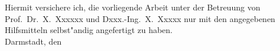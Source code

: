 \vspace*{130mm}
\begin{minipage}{129.5mm}

  Hiermit versichere ich, die vorliegende Arbeit unter der
  Betreuung von Prof.~Dr.~X.~Xxxxxx und Dxxx.-Ing.~X.~Xxxxx 
  nur mit den angegebenen Hilfsmitteln selbst"andig angefertigt
  zu haben. \\ [20mm]

Darmstadt, den

\end{minipage}
\renewcommand{\thepage}{\arabic{page}}
\setcounter{page}{1}
\newpage



